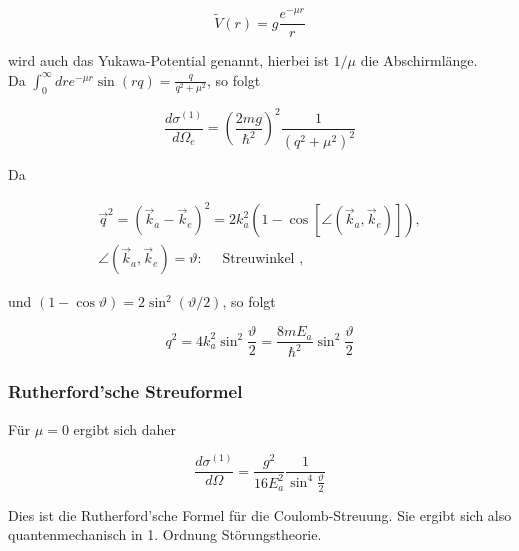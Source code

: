 \documentclass[10pt, letterpaper]{article}
\begin{document}
$$
\tilde{V}(r)=g \frac{e^{-\mu r}}{r}
$$

wird auch das Yukawa-Potential genannt, hierbei ist $1 / \mu$ die Abschirmlänge.\\
Da $\int_{0}^{\infty} d r e^{-\mu r} \sin (r q)=\frac{q}{q^{2}+\mu^{2}}$, so folgt

$$
\frac{d \sigma^{(1)}}{d \Omega_{e}}=\left(\frac{2 m g}{\hbar^{2}}\right)^{2} \frac{1}{\left(q^{2}+\mu^{2}\right)^{2}}
$$

Da

$$
\begin{gathered}
\vec{q}^{2}=\left(\vec{k}_{a}-\vec{k}_{e}\right)^{2}=2 k_{a}^{2}\left(1-\cos \left[\angle\left(\vec{k}_{a}, \vec{k}_{e}\right)\right]\right), \\
\angle\left(\vec{k}_{a}, \vec{k}_{e}\right)=\vartheta: \quad \text { Streuwinkel },
\end{gathered}
$$

und $(1-\cos \vartheta)=2 \sin ^{2}(\vartheta / 2)$, so folgt

$$
q^{2}=4 k_{a}^{2} \sin ^{2} \frac{\vartheta}{2}=\frac{8 m E_{a}}{\hbar^{2}} \sin ^{2} \frac{\vartheta}{2}
$$

\subsubsection*{Rutherford'sche Streuformel}
Für $\mu=0$ ergibt sich daher

$$
\frac{d \sigma^{(1)}}{d \Omega}=\frac{g^{2}}{16 E_{a}^{2}} \frac{1}{\sin ^{4} \frac{\vartheta}{2}}
$$

Dies ist die Rutherford'sche Formel für die Coulomb-Streuung. Sie ergibt sich also quantenmechanisch in 1. Ordnung Störungstheorie.
\end{document}
